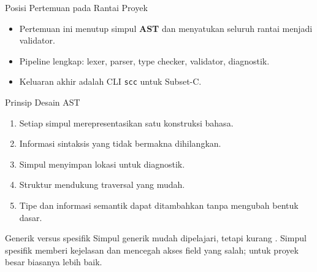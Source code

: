 \documentclass[aspectratio=169,10pt,t]{beamer}
\begin{document}
\begin{frame}{Posisi Pertemuan pada Rantai Proyek}

  \vspace{2pt}
  \begin{itemize}
    \item Pertemuan ini menutup simpul \textbf{AST} dan menyatukan
          seluruh rantai menjadi validator.
    \item Pipeline lengkap: lexer, parser, type checker, validator,
          diagnostik.
    \item Keluaran akhir adalah CLI \texttt{scc} untuk Subset-C.
  \end{itemize}
\end{frame}

\begin{frame}{Prinsip Desain AST}
  \begin{enumerate}
    \setlength{\itemsep}{2pt}
    \item Setiap simpul merepresentasikan satu konstruksi bahasa.
    \item Informasi sintaksis yang tidak bermakna dihilangkan.
    \item Simpul menyimpan lokasi untuk diagnostik.
    \item Struktur mendukung traversal yang mudah.
    \item Tipe dan informasi semantik dapat ditambahkan tanpa mengubah
          bentuk dasar.
  \end{enumerate}

  \vspace{4pt}
  \begin{block}{Generik versus spesifik}
    \footnotesize
    Simpul generik mudah dipelajari, tetapi kurang .
    Simpul spesifik memberi kejelasan dan mencegah akses field yang
    salah; untuk proyek besar biasanya lebih baik.
  \end{block}
\end{frame}
\end{document}
